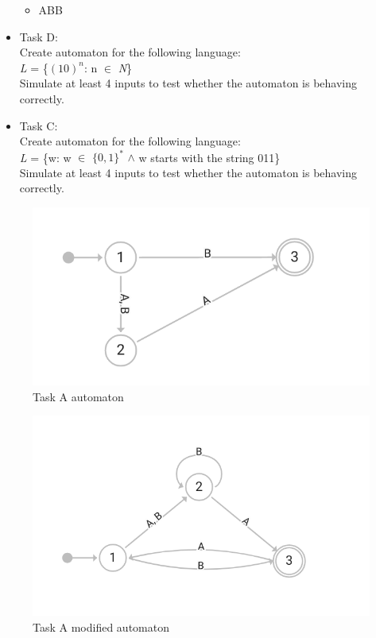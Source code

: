 \begin{itemize}
\begin{itemize}
        \item ABB
    \end{itemize}
    \item Task D:\\
    Create automaton for the following language:\\
    \textit{L} = \{$(10)^{n}$: n $\in$ \textit{N}\}\\
    Simulate at least 4 inputs to test whether the automaton is behaving correctly.
    \item Task C:\\
    Create automaton for the following language:\\
    \textit{L} = \{w: w $\in$ $\{0,1\}^{*}$ $\wedge$ w starts with the string 011\}\\
    Simulate at least 4 inputs to test whether the automaton is behaving correctly.
\end{itemize}

\begin{figure}
    \includegraphics[width=\textwidth]{basic_automaton}
    \caption{Task A automaton}\label{task-a-automaton}
\end{figure}

\begin{figure}
    \includegraphics[width=\textwidth]{basic_automaton_2}
    \caption{Task A modified automaton}\label{task-a-automaton-modified}
\end{figure}

